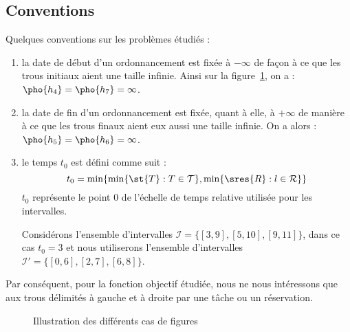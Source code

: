 \subsection{Conventions}
    Quelques conventions sur les problèmes étudiés : \begin{enumerate}
        \item la date de début d'un ordonnancement est fixée à $- \infty$ de façon à
            ce que les trous initiaux aient une taille infinie. Ainsi sur la figure~\ref{prescas},
            on a : $\pho{h_4} = \pho{h_7} = \infty$.
        \item la date de fin d'un ordonnancement est fixée, quant à elle, à
            $+\infty$ de manière à ce que les trous finaux aient eux aussi une taille infinie. On a
            alors : $\pho{h_5} = \pho{h_6} = \infty$.
        \item le temps $t_0$ est défini comme suit : \[
                t_0 = \min\{\min\{\st{T} : T \in \mathcal{T}\}, \min\{\sres{R} : l \in \mathcal{R}\}\}
            \]
            $t_0$ représente le point $0$ de l'échelle de temps relative utilisée pour les
            intervalles.

            Considérons l'ensemble d'intervalles $\mathcal{I} = \{[3,9], [5,10], [9,11]\}$, dans ce
            cas $t_0 = 3$ et nous utiliserons l'ensemble d'intervalles $\mathcal{I}' = \{[0,6],
            [2,7], [6,8]\}$.
    \end{enumerate}

    Par conséquent, pour la fonction objectif étudiée, nous ne
    nous intéressons que aux trous délimités à gauche et à droite par une tâche ou un réservation.

\begin{figure}
    \begin{center}
        \begin{ordo}[10]{3}{1}{9}




        \end{ordo}
    \end{center}
    \caption{Illustration des différents cas de figures}
    \label{prescas}
\end{figure}

